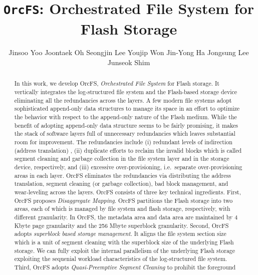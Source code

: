 \documentclass[prodmode,acmtecs]{acmsmall}
\begin{document}

\title{\texttt{OrcFS}: Orchestrated File System for Flash Storage} 
\author{Jinsoo Yoo
Joontaek Oh
Seongjin Lee
Youjip Won
Jin-Yong Ha
Jongsung Lee
Junseok Shim
}

\begin{abstract}
In this work, we develop OrcFS, \emph{Orchestrated File System} for Flash 
storage. It vertically integrates the log-structured file system and the 
Flash-based storage device eliminating all the redundancies across the 
layers. A few modern file systems adopt sophisticated
append-only data structures to manage its space
in an effort to optimize the behavior with respect to the
append-only nature of the Flash medium.
While the benefit of adopting append-only data structure 
seems to be fairly promising, it makes the stack of software layers full of 
unnecessary redundancies which leaves substantial room for improvement. The 
redundancies include  (i)  redundant levels of indirection  (address
translation) ,  (ii)   duplicate efforts to reclaim the invalid blocks
which is called segment cleaning  and garbage collection in the
file system layer and in the storage device,  respectively, and  (iii)
excessive over-provisioning, i.e.~separate over-provisioning areas in each
layer. OrcFS eliminates the 
redundancies via  distributing the address 
translation, segment cleaning  (or garbage collection), bad block
management, and wear-leveling across the layers.  OrcFS 
consists of three key technical ingredients.
First, OrcFS proposes \emph{Disaggregate Mapping}. OrcFS partitions the Flash storage 
into two areas, each of which is managed by file system and flash storage, 
respectively, with different granularity. In OrcFS, the metadata area and data 
area are maintained by 4 Kbyte page granularity and the 256 Mbyte 
superblock granularity. Second, OrcFS adopts \emph{superblock based storage
management}. It aligns the file system section size which 
is a unit of segment cleaning with the superblock size of the underlying Flash 
storage. We can fully exploit the internal parallelism of the underlying Flash 
storage exploiting the sequenial workload characteristics of the log-structured 
file system.
Third, OrcFS adopts \emph{Quasi-Preemptive Segment Cleaning} to prohibit the foreground 

\end{abstract}
\end{document}
